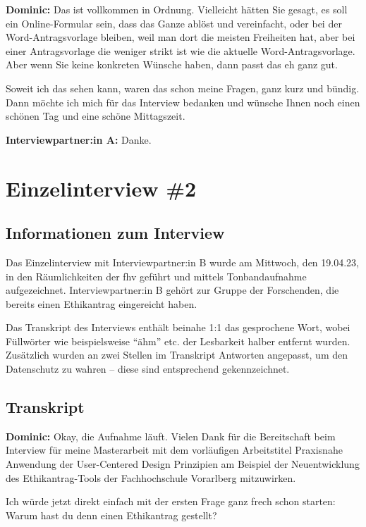 \documentclass[a4paper,12pt,twoside]{scrreprt}
\begin{document}
\textbf{Dominic:} Das ist vollkommen in Ordnung. Vielleicht hätten Sie gesagt, es soll ein Online-Formular sein, dass das Ganze ablöst und vereinfacht, oder bei der Word-Antragsvorlage bleiben, weil man dort die meisten Freiheiten hat, aber bei einer Antragsvorlage die weniger strikt ist wie die aktuelle Word-Antragsvorlage. Aber wenn Sie keine konkreten Wünsche haben, dann passt das eh ganz gut. 

Soweit ich das sehen kann, waren das schon meine Fragen, ganz kurz und bündig. Dann möchte ich mich für das Interview bedanken und wünsche Ihnen noch einen schönen Tag und eine schöne Mittagszeit.

\textbf{Interviewpartner:in A:} Danke.

\chapter{Einzelinterview \#2}
\label{appendix:interview-2}

\section{Informationen zum Interview}
\label{appendix:interview-2-infos}

Das Einzelinterview mit Interviewpartner:in B wurde am Mittwoch, den 19.04.23, in den Räumlichkeiten der \ac{fhv} geführt und mittels Tonbandaufnahme aufgezeichnet. Interviewpartner:in B gehört zur Gruppe der Forschenden, die bereits einen Ethikantrag eingereicht haben.

Das Transkript des Interviews enthält beinahe 1:1 das gesprochene Wort, wobei Füllwörter wie beispielsweise \enquote{ähm} etc. der Lesbarkeit halber entfernt wurden. Zusätzlich wurden an zwei Stellen im Transkript Antworten angepasst, um den Datenschutz zu wahren -- diese sind entsprechend gekennzeichnet.

\section{Transkript}
\label{appendix:interview-2-transkript}

\textbf{Dominic:} Okay, die Aufnahme läuft. Vielen Dank für die Bereitschaft beim Interview für meine Masterarbeit mit dem vorläufigen Arbeitstitel Praxisnahe Anwendung der User-Centered Design Prinzipien am Beispiel der Neuentwicklung des Ethikantrag-Tools der Fachhochschule Vorarlberg mitzuwirken.

Ich würde jetzt direkt einfach mit der ersten Frage ganz frech schon starten: Warum hast du denn einen Ethikantrag gestellt?
\end{document}
